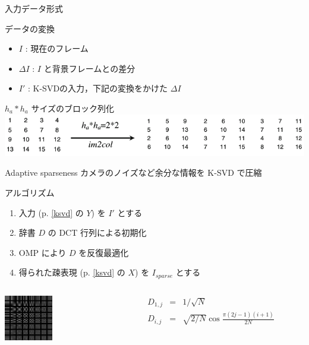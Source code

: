 \begin{frame}{入力データ形式}
\begin{block}{データの変換}
\begin{itemize}
 \item $I$ : 現在のフレーム
 \item $\Delta I$ : $I$ と背景フレームとの差分
 \item $I'$ : K-SVDの入力，下記の変換をかけた $\Delta I$
\end{itemize}
\end{block}
$h_a * h_a$ サイズのブロック列化
\includegraphics[scale=0.5]{figure/im2col.png}
\end{frame}


\begin{frame}{Adaptive sparseness}
カメラのノイズなど余分な情報を K-SVD で圧縮

\begin{block}{アルゴリズム}
\begin{enumerate}
    \item 入力 (p. \ref{ksvd} の $Y$) を $I'$ とする
    \item 辞書 $D$ の DCT 行列による初期化
    \item OMP により $D$ を反復最適化
    \item 得られた疎表現 (p. \ref{ksvd} の $X$) を $I_{sparse}$ とする
\end{enumerate}
\end{block}
    \begin{columns}
        \begin{column}{0.2\textwidth} %
            \includegraphics[height=2cm]{figure/dct.png}
        \end{column}
        \begin{column}{0.8\textwidth} %
        \begin{eqnarray}
            D_{1,j} & = & 1 / \sqrt{N} \\
            D_{i,j} & = & \sqrt{2/N} \cos{\frac{\pi (2j - 1) (i + 1)}{2 N}}
        \end{eqnarray}
        \end{column}
    \end{columns}

\end{frame}



